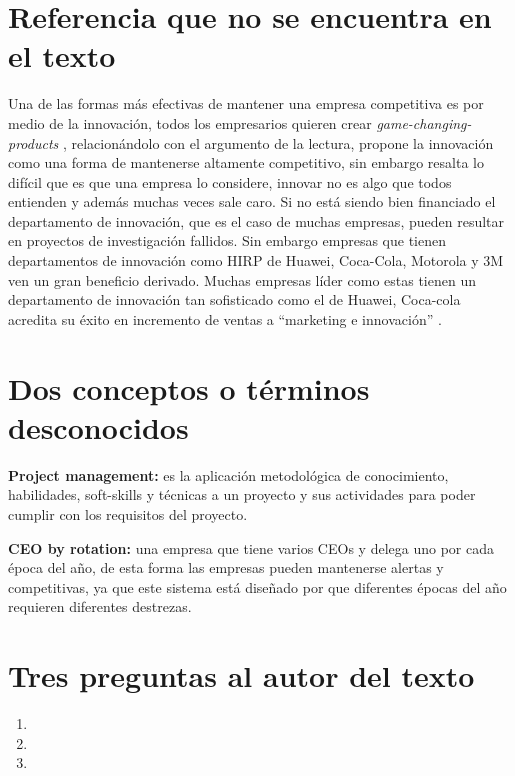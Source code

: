 \documentclass{article}
\begin{document}
\section{Referencia que no se encuentra en el texto}
Una de las formas más efectivas de mantener una empresa competitiva es por medio de la innovación, todos los empresarios quieren crear \emph{game-changing-products} \cite{arti}, relacionándolo con el argumento de la lectura, propone la innovación como una forma de mantenerse altamente competitivo, sin embargo resalta lo difícil que es que una empresa lo considere, innovar no es algo que todos entienden y además muchas veces sale caro. Si no está siendo bien financiado el departamento de innovación, que es el caso de muchas empresas, pueden resultar en proyectos de investigación fallidos. Sin embargo empresas que tienen departamentos de innovación como HIRP de Huawei, Coca-Cola, Motorola y 3M ven un gran beneficio derivado. Muchas empresas líder como estas tienen un departamento de innovación tan sofisticado como el de Huawei, Coca-cola acredita su éxito en incremento de ventas a ``marketing e innovación'' \cite{inov}.

\section{Dos conceptos o términos desconocidos}
\textbf{Project management:} es la aplicación metodológica de conocimiento, habilidades, soft-skills y técnicas a un proyecto y sus actividades para poder cumplir con los requisitos del proyecto. \cite{pm} \par 
\textbf{CEO by rotation:} una empresa que tiene varios CEOs y delega uno por cada época del año, de esta forma las empresas pueden mantenerse alertas y competitivas, ya que este sistema está diseñado por que diferentes épocas del año requieren diferentes destrezas. \cite{CEObr}

\section{Tres preguntas al autor del texto}
\begin{enumerate}
    \item {} 
    \item {} 
    \item {}  
\end{enumerate} 
\end{document}
